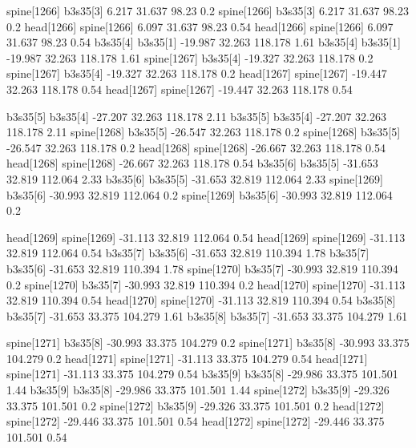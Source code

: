 spine[1266]    b3s35[3]    6.217    31.637    98.23    0.2
spine[1266]    b3s35[3]    6.217    31.637    98.23    0.2
head[1266]    spine[1266]    6.097    31.637    98.23    0.54
head[1266]    spine[1266]    6.097    31.637    98.23    0.54
b3s35[4]    b3s35[1]    -19.987    32.263    118.178    1.61
b3s35[4]    b3s35[1]    -19.987    32.263    118.178    1.61
spine[1267]    b3s35[4]    -19.327    32.263    118.178    0.2
spine[1267]    b3s35[4]    -19.327    32.263    118.178    0.2
head[1267]    spine[1267]    -19.447    32.263    118.178    0.54
head[1267]    spine[1267]    -19.447    32.263    118.178    0.54


b3s35[5]    b3s35[4]    -27.207    32.263    118.178    2.11
b3s35[5]    b3s35[4]    -27.207    32.263    118.178    2.11
spine[1268]    b3s35[5]    -26.547    32.263    118.178    0.2
spine[1268]    b3s35[5]    -26.547    32.263    118.178    0.2
head[1268]    spine[1268]    -26.667    32.263    118.178    0.54
head[1268]    spine[1268]    -26.667    32.263    118.178    0.54
b3s35[6]    b3s35[5]    -31.653    32.819    112.064    2.33
b3s35[6]    b3s35[5]    -31.653    32.819    112.064    2.33
spine[1269]    b3s35[6]    -30.993    32.819    112.064    0.2
spine[1269]    b3s35[6]    -30.993    32.819    112.064    0.2


head[1269]    spine[1269]    -31.113    32.819    112.064    0.54
head[1269]    spine[1269]    -31.113    32.819    112.064    0.54
b3s35[7]    b3s35[6]    -31.653    32.819    110.394    1.78
b3s35[7]    b3s35[6]    -31.653    32.819    110.394    1.78
spine[1270]    b3s35[7]    -30.993    32.819    110.394    0.2
spine[1270]    b3s35[7]    -30.993    32.819    110.394    0.2
head[1270]    spine[1270]    -31.113    32.819    110.394    0.54
head[1270]    spine[1270]    -31.113    32.819    110.394    0.54
b3s35[8]    b3s35[7]    -31.653    33.375    104.279    1.61
b3s35[8]    b3s35[7]    -31.653    33.375    104.279    1.61


spine[1271]    b3s35[8]    -30.993    33.375    104.279    0.2
spine[1271]    b3s35[8]    -30.993    33.375    104.279    0.2
head[1271]    spine[1271]    -31.113    33.375    104.279    0.54
head[1271]    spine[1271]    -31.113    33.375    104.279    0.54
b3s35[9]    b3s35[8]    -29.986    33.375    101.501    1.44
b3s35[9]    b3s35[8]    -29.986    33.375    101.501    1.44
spine[1272]    b3s35[9]    -29.326    33.375    101.501    0.2
spine[1272]    b3s35[9]    -29.326    33.375    101.501    0.2
head[1272]    spine[1272]    -29.446    33.375    101.501    0.54
head[1272]    spine[1272]    -29.446    33.375    101.501    0.54


